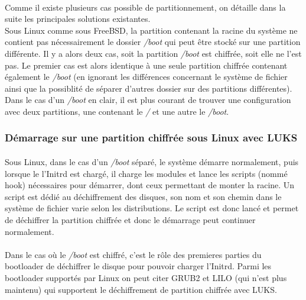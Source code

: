 \paragraph{}
Comme il existe plusieurs cas possible de partitionnement, on détaille dans la
suite les principales solutions existantes.
\\
Sous Linux comme sous FreeBSD, la partition contenant la racine du système ne
contient pas nécessairement le dossier {\em /boot} qui peut être stocké sur une
partition différente. Il y a alors deux cas, soit la partition {\em /boot} est
chiffrée, soit elle ne l'est pas. Le premier cas est alors identique à une seule
partition chiffrée contenant également le {\em /boot} (en ignorant les
différences concernant le système de fichier ainsi que la possiblité de séparer
d'autres dossier sur des partitions différentes). Dans le cas d'un {\em /boot}
en clair, il est plus courant de trouver une configuration avec deux partitions,
une contenant le {\em /} et une autre le {\em /boot}.

\subsubsection{Démarrage sur une partition chiffrée sous Linux avec LUKS}

\paragraph{}
Sous Linux, dans le cas d'un {\em /boot} séparé, le système démarre normalement,
puis lorsque le l'Initrd est chargé, il charge les modules et lance les scripts
(nommé hook) nécessaires pour démarrer, dont ceux permettant de monter la
racine. Un script est dédié au déchiffrement des disques, son nom et son chemin
dans le système de fichier varie selon les distributions. Le script est donc
lancé et permet de déchiffrer la partition chiffrée et donc le démarrage
peut continuer normalement.

\paragraph{}
Dans le cas où le {\em /boot} est chiffré, c'est le rôle des premieres parties
du bootloader de déchiffrer le disque pour pouvoir charger l'Initrd. Parmi les
bootloader supportés par Linux on peut citer GRUB2 et LILO
(qui n'est plus maintenu) qui supportent le déchiffrement de partition chiffrée
avec LUKS.

